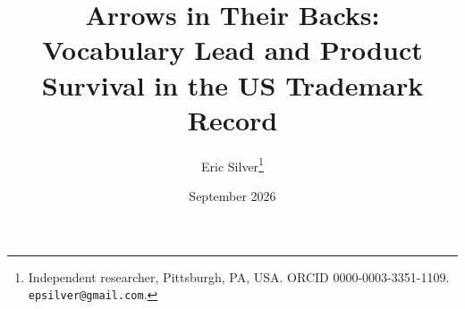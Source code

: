 
\newcommand{\onlineappendixnote}{\url{https://aporia.institute/tm-vocabulary/online-appendix/}}
\graphicspath{{../../}}
\makeatletter{}\makeatother
\title{\bfseries Arrows in Their Backs:\\
\large Vocabulary Lead and Product Survival in the US Trademark Record}
\author{Eric Silver\thanks{Independent researcher, Pittsburgh, PA, USA.
ORCID 0000-0003-3351-1109. \texttt{epsilver@gmail.com}.}}
\date{September 2026}

\usepackage{placeins}

\maketitle











\FloatBarrier




